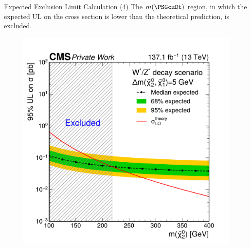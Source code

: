 \begin{frame}[fragile]{Expected Exclusion Limit  Calculation (4)}
  The \(m(\PSGczDt)\) region, in which the expected UL on the cross section is lower than the theoretical prediction, is excluded.
  	\begin{figure}[htpb]
  	  \centering
  	  \includegraphics[height=0.6\textheight]{fig/limit-example/step-4.pdf}
  	\end{figure}
\end{frame}

